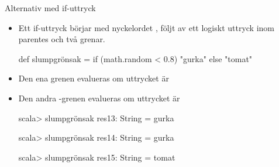 \begin{Slide}{Alternativ med if-uttryck}
\begin{itemize}
\item Ett if-uttryck börjar med nyckelordet , följt av ett logiskt uttryck inom parentes och två grenar.
\begin{Code}
def slumpgrönsak = if (math.random < 0.8) "gurka" else "tomat"
\end{Code}
\item Den ena grenen evalueras om uttrycket är 
\item Den andra -grenen evalueras om uttrycket är 
\begin{REPLnonum}
scala> slumpgrönsak
res13: String = gurka

scala> slumpgrönsak
res14: String = gurka

scala> slumpgrönsak
res15: String = tomat

\end{REPLnonum}
\end{itemize}
\end{Slide}



